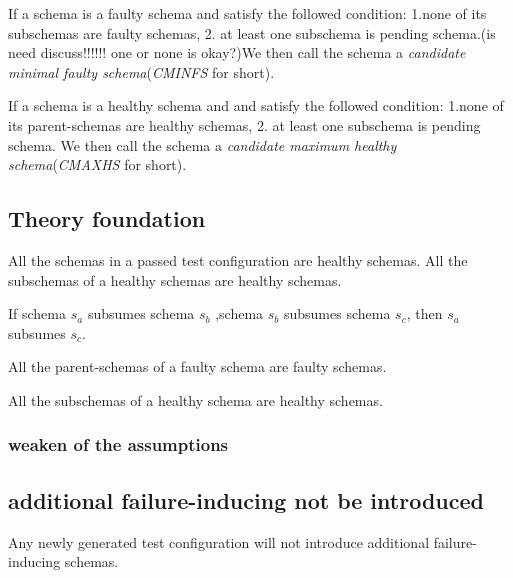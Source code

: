 \documentclass[10pt,journal,cspaper,compsoc]{IEEEtran}
\begin{document}
\begin{definition}
If a schema is a faulty schema and satisfy the followed condition:
1.none of its subschemas are faulty schemas, 2. at least one subschema is pending schema.(is need discuss!!!!!! one or none is okay?)We then call the schema a \emph{candidate minimal faulty schema}(\emph{CMINFS} for short).
\end{definition}
\begin{definition}
If a schema is a healthy schema and and satisfy the followed condition:
1.none of its  parent-schemas are healthy schemas, 2. at least one subschema is pending schema. We then call the schema a \emph{candidate maximum healthy schema}(\emph{CMAXHS} for short).
\end{definition}


\subsection{Theory foundation}
\begin{proposition}
All the schemas in a passed test configuration are healthy schemas.
All the subschemas of a healthy schemas are healthy schemas.
\end{proposition}
\begin{proposition}
If schema $s_{a}$ subsumes  schema $s_{b}$ ,schema  $s_{b}$ subsumes schema $s_{c}$, then $s_{a}$  subsumes $s_{c}$.
\end{proposition}
\begin{proposition}
All the parent-schemas of a faulty schema are faulty schemas.
\end{proposition}
\begin{proposition}
All the subschemas of a healthy schema are healthy schemas.
\end{proposition}

\subsubsection{weaken of the assumptions}


\subsection{additional failure-inducing not be introduced}
\begin{assumption}
Any newly generated test configuration will not introduce additional failure-inducing schemas.
\end{assumption}
\end{document}
